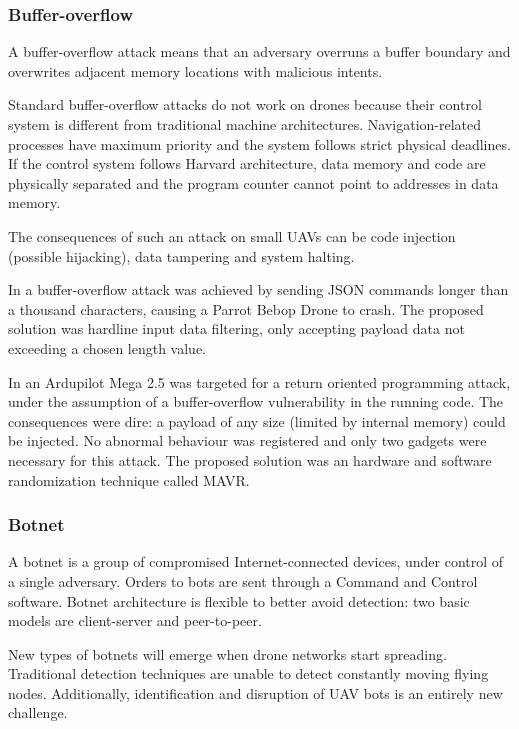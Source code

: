 \documentclass[journal]{IEEEtran}
\begin{document}
\subsubsection{Buffer-overflow}
A buffer-overflow attack means that an adversary overruns a buffer boundary and overwrites adjacent memory locations with malicious intents.

Standard buffer-overflow attacks do not work on drones because their control system is different from traditional machine architectures. Navigation-related processes have maximum priority and the system follows strict physical deadlines. If the control system follows Harvard architecture, data memory and code are physically separated and the program counter cannot point to addresses in data memory.

The consequences of such an attack on small UAVs can be code injection (possible hijacking), data tampering and system halting.

In \cite{uavcommonsecurityattacks} a buffer-overflow attack was achieved by sending JSON commands longer than a thousand characters, causing a Parrot Bebop Drone \cite{bebop} to crash. The proposed solution was hardline input data filtering, only accepting payload data not exceeding a chosen length value.

In \cite{stealthyrop} an Ardupilot Mega 2.5 \cite{ardupilot} was targeted for a return oriented programming attack, under the assumption of a buffer-overflow vulnerability in the running code. The consequences were dire: a payload of any size (limited by internal memory) could be injected. No abnormal behaviour was registered and only two gadgets were necessary for this attack. The proposed solution was an hardware and software randomization technique called MAVR.

\subsubsection{Botnet}
A botnet is a group of compromised Internet-connected devices, under control of a single adversary. Orders to bots are sent through a Command and Control software. Botnet architecture is flexible to better avoid detection: two basic models are client-server and peer-to-peer.

New types of botnets will emerge when drone networks start spreading. Traditional detection techniques are unable to detect constantly moving flying nodes. Additionally, identification and disruption of UAV bots is an entirely new challenge.
\end{document}
